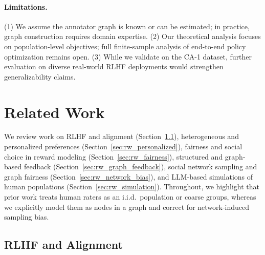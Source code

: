 \documentclass{article}
\theoremstyle{plain}
\theoremstyle{definition}
\theoremstyle{remark}
\begin{document}
\paragraph{Limitations.}
(1) We assume the annotator graph is known or can be estimated; in practice, graph construction requires domain expertise.
(2) Our theoretical analysis focuses on population-level objectives; full finite-sample analysis of end-to-end policy optimization remains open.
(3) While we validate on the CA-1 dataset, further evaluation on diverse real-world RLHF deployments would strengthen generalizability claims.

\nocite{langley00}




\newpage
\appendix
\onecolumn

\section{Related Work}
\label{sec:related}

We review work on RLHF and alignment (Section~\ref{sec:rw_rlhf}), heterogeneous and personalized preferences (Section~\ref{sec:rw_personalized}), fairness and social choice in reward modeling (Section~\ref{sec:rw_fairness}), structured and graph-based feedback (Section~\ref{sec:rw_graph_feedback}), social network sampling and graph fairness (Section~\ref{sec:rw_network_bias}), and LLM-based simulations of human populations (Section~\ref{sec:rw_simulation}).
Throughout, we highlight that prior work treats human raters as an i.i.d.\ population or coarse groups, whereas we explicitly model them as nodes in a graph and correct for network-induced sampling bias.

\subsection{RLHF and Alignment}
\label{sec:rw_rlhf}
\end{document}
